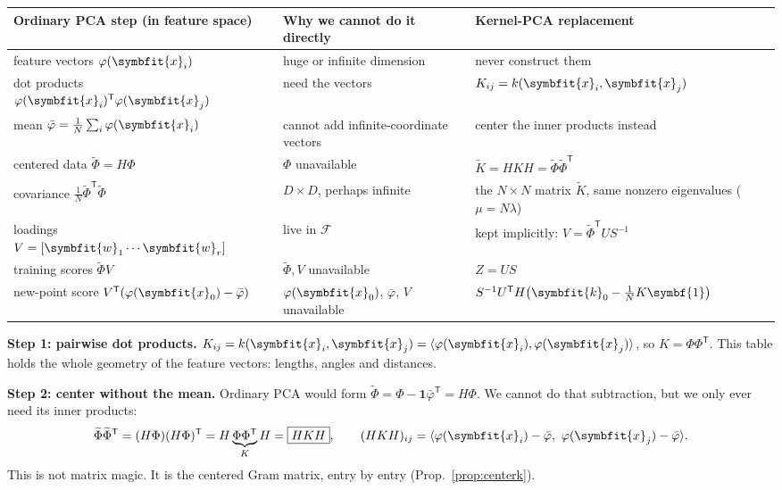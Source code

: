 \documentclass[11pt]{article}
\newcommand{\bm}[1]{\symbfit{#1}}
\newcommand{\vx}{\bm{x}}
\newcommand{\vw}{\bm{w}}
\newcommand{\one}{\symbf{1}}
\newcommand{\T}{^{\mathsf T}}
\begin{document}
\begin{center}
\renewcommand{\arraystretch}{1.35}
\small
\begin{tabular}{@{}>{\raggedright\arraybackslash}p{3.6cm}>{\raggedright\arraybackslash}p{4.4cm}>{\raggedright\arraybackslash}p{5.2cm}@{}}
\toprule
Ordinary PCA step (in feature space) & Why we cannot do it directly & Kernel-PCA replacement \\
\midrule
feature vectors $\varphi(\vx_i)$ & huge or infinite dimension & never construct them \\
dot products $\varphi(\vx_i)\T\varphi(\vx_j)$ & need the vectors & $K_{ij}=k(\vx_i,\vx_j)$ \\
mean $\bar\varphi=\tfrac1N\sum_i\varphi(\vx_i)$ & cannot add infinite-coordinate vectors & center the inner products instead \\
centered data $\widetilde\Phi=H\Phi$ & $\Phi$ unavailable & $\widetilde K=HKH=\widetilde\Phi\widetilde\Phi\T$ \\
covariance $\tfrac1N\widetilde\Phi\T\widetilde\Phi$ & $D\times D$, perhaps infinite & the $N\times N$ matrix $\widetilde K$, same nonzero eigenvalues ($\mu=N\lambda$) \\
loadings $V=[\vw_1\cdots\vw_r]$ & live in $\mathcal F$ & kept implicitly: $V=\widetilde\Phi\T US^{-1}$ \\
training scores $\widetilde\Phi V$ & $\widetilde\Phi,V$ unavailable & $Z=US$ \\
new-point score $V\T(\varphi(\vx_0)-\bar\varphi)$ & $\varphi(\vx_0)$, $\bar\varphi$, $V$ unavailable & $S^{-1}U\T H\big(\bm k_0-\tfrac1NK\one\big)$ \\
\bottomrule
\end{tabular}
\end{center}

\textbf{Step 1: pairwise dot products.} $K_{ij}=k(\vx_i,\vx_j)=\langle\varphi(\vx_i),\varphi(\vx_j)\rangle$, so $K=\Phi\Phi\T$. This table holds
the whole geometry of the feature vectors: lengths, angles and distances.

\textbf{Step 2: center without the mean.} Ordinary PCA would form $\widetilde\Phi=\Phi-\one\bar\varphi\T=H\Phi$. We cannot do that subtraction,
but we only ever need its inner products:
\[
\widetilde\Phi\widetilde\Phi\T=(H\Phi)(H\Phi)\T=H\underbrace{\Phi\Phi\T}_{K}H=\boxed{HKH},
\qquad (HKH)_{ij}=\langle\varphi(\vx_i)-\bar\varphi,\ \varphi(\vx_j)-\bar\varphi\rangle .
\]
This is not matrix magic. It is the centered Gram matrix, entry by entry (Prop.~\ref{prop:centerk}).
\end{document}
